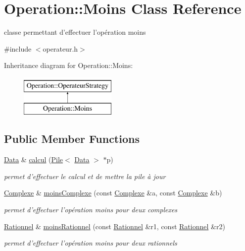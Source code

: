 \hypertarget{classOperation_1_1Moins}{
\section{Operation::Moins Class Reference}
\label{classOperation_1_1Moins}
}


classe permettant d'effectuer l'opération moins  




{\ttfamily \#include $<$operateur.h$>$}

Inheritance diagram for Operation::Moins:\begin{figure}[H]
\begin{center}
\leavevmode
\includegraphics[height=2cm]{classOperation_1_1Moins}
\end{center}
\end{figure}
\subsection*{Public Member Functions}
\begin{DoxyCompactItemize}
\item 
\hyperlink{classNombre_1_1Data}{Data} \& \hyperlink{classOperation_1_1Moins_a7dba34c5ff9f32018370b7aaf46bbc84}{calcul} (\hyperlink{classPile}{Pile}$<$ \hyperlink{classNombre_1_1Data}{Data} $>$ $\ast$p)
\begin{DoxyCompactList}\small\item\em permet d'effectuer le calcul et de mettre la pile à jour \item\end{DoxyCompactList}\item 
\hyperlink{classNombre_1_1Complexe}{Complexe} \& \hyperlink{classOperation_1_1Moins_a1d49715fe851f1d09fdf9532c4c5e210}{moinsComplexe} (const \hyperlink{classNombre_1_1Complexe}{Complexe} \&a, const \hyperlink{classNombre_1_1Complexe}{Complexe} \&b)
\begin{DoxyCompactList}\small\item\em permet d'effectuer l'opération moins pour deux complexes \item\end{DoxyCompactList}\item 
\hyperlink{classNombre_1_1Rationnel}{Rationnel} \& \hyperlink{classOperation_1_1Moins_a84a64fdbd90f28955efd0ed26c80f597}{moinsRationnel} (const \hyperlink{classNombre_1_1Rationnel}{Rationnel} \&r1, const \hyperlink{classNombre_1_1Rationnel}{Rationnel} \&r2)
\begin{DoxyCompactList}\small\item\em permet d'effectuer l'opération moins pour deux rationnels \item\end{DoxyCompactList}\end{DoxyCompactItemize}



